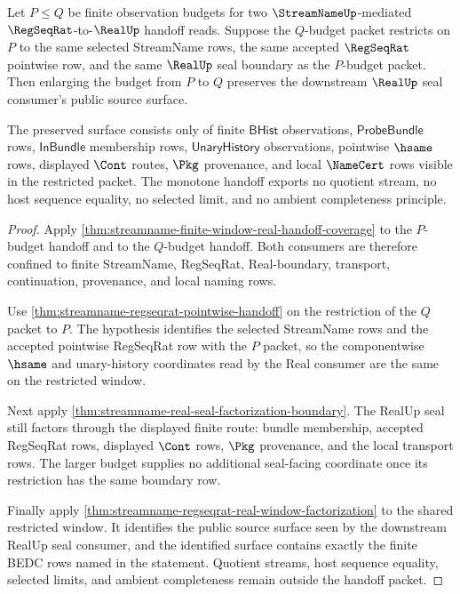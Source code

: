 \begin{theorem}
\label{thm:streamname-finite-window-budget-monotonicity}
Let $P \leq Q$ be finite observation budgets for two $\StreamNameUp$-mediated $\RegSeqRat$-to-$\RealUp$ handoff reads. Suppose the $Q$-budget packet restricts on $P$ to the same selected StreamName rows, the same accepted $\RegSeqRat$ pointwise row, and the same $\RealUp$ seal boundary as the $P$-budget packet. Then enlarging the budget from $P$ to $Q$ preserves the downstream $\RealUp$ seal consumer's public source surface.

The preserved surface consists only of finite $\mathsf{BHist}$ observations, $\mathsf{ProbeBundle}$ rows, $\mathsf{InBundle}$ membership rows, $\mathsf{UnaryHistory}$ observations, pointwise $\hsame$ rows, displayed $\Cont$ routes, $\Pkg$ provenance, and local $\NameCert$ rows visible in the restricted packet. The monotone handoff exports no quotient stream, no host sequence equality, no selected limit, and no ambient completeness principle.
\end{theorem}
\begin{proof}
Apply \autoref{thm:streamname-finite-window-real-handoff-coverage} to the $P$-budget handoff and to the $Q$-budget handoff. Both consumers are therefore confined to finite StreamName, RegSeqRat, Real-boundary, transport, continuation, provenance, and local naming rows.

Use \autoref{thm:streamname-regseqrat-pointwise-handoff} on the restriction of the $Q$ packet to $P$. The hypothesis identifies the selected StreamName rows and the accepted pointwise RegSeqRat row with the $P$ packet, so the componentwise $\hsame$ and unary-history coordinates read by the Real consumer are the same on the restricted window.

Next apply \autoref{thm:streamname-real-seal-factorization-boundary}. The RealUp seal still factors through the displayed finite route: bundle membership, accepted RegSeqRat rows, displayed $\Cont$ rows, $\Pkg$ provenance, and the local transport rows. The larger budget supplies no additional seal-facing coordinate once its restriction has the same boundary row.

Finally apply \autoref{thm:streamname-regseqrat-real-window-factorization} to the shared restricted window. It identifies the public source surface seen by the downstream RealUp seal consumer, and the identified surface contains exactly the finite BEDC rows named in the statement. Quotient streams, host sequence equality, selected limits, and ambient completeness remain outside the handoff packet.
\end{proof}

